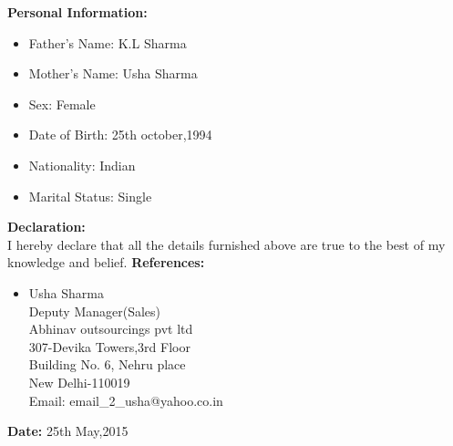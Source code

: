 \documentclass[10pt,a4paper]{article}
\begin{document}
\begin{flushleft}
		 \textbf{Personal Information:}\\
		 
		 \begin{itemize}
		 	\item Father's Name: K.L Sharma\\
		 	\item Mother's Name: Usha Sharma\\
		 	\item Sex:  Female\\
		 	\item Date of Birth: 25th october,1994\\
		 	\item Nationality: Indian\\
		 	\item Marital Status: Single\\
		 \end{itemize}
		   \textbf{ Declaration: }\\
		   I hereby declare that all the details furnished above are true to the best of my knowledge and belief.
		   \medskip
		   \textbf{ References: }\\
		   
		   \begin{itemize}
		   	\item Usha Sharma\\
		   	Deputy Manager(Sales) \\
		   	Abhinav outsourcings pvt ltd\\
		   	307-Devika Towers,3rd Floor\\
		   	Building No. 6, Nehru place\\
		   	New Delhi-110019\\
		   	Email: email\_2\_usha@yahoo.co.in
		   	
		   \end{itemize}
		    \textbf{ Date: }25th May,2015\\
	
\end{flushleft}

 
\end{document}

